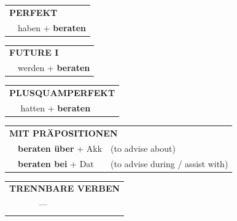 \documentclass[10pt,a4paper]{revtex4-2}
\begin{document}
\begin{verbbox-acc}
\vspace{10pt}

\begin{tabular}{rl}
\multicolumn{2}{l}{\textbf{PERFEKT}}\\
& haben + \textbf{beraten}\\
\end{tabular}
\hfill
\begin{tabular}{rl}
\multicolumn{2}{l}{\textbf{FUTURE I}}\\
& werden + \textbf{beraten}\\
\end{tabular}
\hfill
\begin{tabular}{rl}
\multicolumn{2}{l}{\textbf{PLUSQUAMPERFEKT}}\\
& hatten + \textbf{beraten}\\
\end{tabular}

\vspace{10pt}

\begin{tabular}{lll}
\multicolumn{3}{l}{\textbf{MIT PRÄPOSITIONEN}}\\
& \textbf{beraten über} + Akk & (to advise about)\\
& \textbf{beraten bei} + Dat & (to advise during / assist with)\\
\end{tabular}
\hfill
\begin{tabular}{lll}
\multicolumn{3}{l}{\textbf{TRENNBARE VERBEN}}\\
& --- & \\
\vspace{10pt}
\end{tabular}

\vspace{-5pt}

\end{verbbox-acc}
\end{document}
